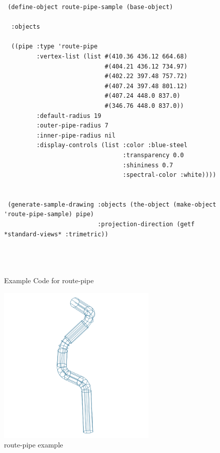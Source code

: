 \documentclass [11pt]{book}
\begin{document}
\begin{itemize}
\begin{figure}
\begin{lrbox}{\boxedverb}
\begin{minipage}{\linewidth}
{\begin{verbatim}
 (define-object route-pipe-sample (base-object)

  :objects

  ((pipe :type 'route-pipe
         :vertex-list (list #(410.36 436.12 664.68) 
                            #(404.21 436.12 734.97) 
                            #(402.22 397.48 757.72) 
                            #(407.24 397.48 801.12) 
                            #(407.24 448.0 837.0)
                            #(346.76 448.0 837.0))
         :default-radius 19
         :outer-pipe-radius 7
         :inner-pipe-radius nil
         :display-controls (list :color :blue-steel 
                                 :transparency 0.0 
                                 :shininess 0.7 
                                 :spectral-color :white))))

 
 (generate-sample-drawing :objects (the-object (make-object 'route-pipe-sample) pipe)
                          :projection-direction (getf *standard-views* :trimetric))
  



\end{verbatim}}
\end{minipage}
\end{lrbox}
\fbox{\usebox{\boxedverb}}

\caption{Example Code for route-pipe}

\label{fig:example-code-route-pipe}

\end{figure}

\begin{figure}
\begin{center}
\includegraphics[width=3in,height=3in]{../images/example-route-pipe.pdf}
\end{center}

\caption{route-pipe example}


\end{figure}
\end{itemize}
\end{document}
